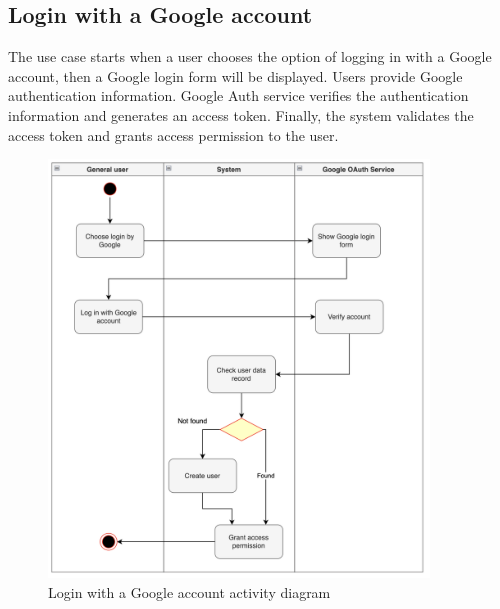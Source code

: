 \subsection{Login with a Google account}
The use case starts when a user chooses the option of logging in with a Google account, then a Google login form will be displayed. Users provide Google authentication information. Google Auth service verifies the authentication information and generates an access token. Finally, the system validates the access token and grants access permission to the user.
\begin{figure}[H]
  \centering
  \includegraphics[width=0.9\textwidth]{Figures/login_gg.png}
  \caption{Login with a Google account activity diagram}
  \label{fig:login-google}
\end{figure}
\newpage

